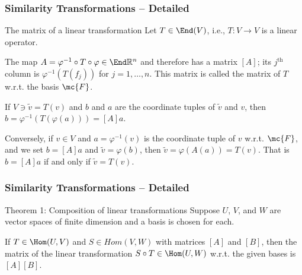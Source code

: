 \begin{frame}
    \frametitle{Similarity Transformations -- Detailed}

    \begin{block}{The matrix of a linear transformation}
        Let $T \in \End(V)$, i.e., $T: V \rightarrow V$ is a linear operator.
        
        The map $A = \varphi^{-1} \circ T \circ \varphi \in \End \mathbb{R}^n$
        and therefore has a matrix $[A]$; its $j^{\textrm{th}}$ column is
        $\varphi^{-1}(T(f_j))$ for $j = 1, \ldots, n$. This matrix is called the
        matrix of $T$ w.r.t. the basis $\mc{F}$.

        If $V \ni \tilde{v} = T(v)$ and $b$ and $a$ are the coordinate tuples of 
        $\tilde{v}$ and $v$, then $b = \varphi^{-1}\left(T(\varphi(a))\right) = 
        [A]a$. 

        Conversely, if $v \in V$ and $a = \varphi^{-1}(v)$ is the coordinate
        tuple of $v$ w.r.t. $\mc{F}$, and we set $b = [A]a$ and $\tilde{v} =
        \varphi(b)$, then $\tilde{v} = \varphi(A(a)) = T(v)$. That is $b = [A]a$ 
        if and only if $\tilde{v} = T(v)$.
    \end{block}
    
\end{frame}

\begin{frame}
    \frametitle{Similarity Transformations -- Detailed}

    \begin{block}{Theorem 1: Composition of linear transformations}
        Suppose $U$, $V$, and $W$ are vector spaces of finite dimension and a
        basis is chosen for each. 
        
        If $T \in \Hom(U, V)$ and $S \in Hom(V, W)$ with matrices $[A]$ and
        $[B]$, then the matrix of the linear transformation $S \circ T \in
        \Hom(U, W)$ w.r.t. the given bases is $[A][B]$.
    \end{block}
\end{frame}


